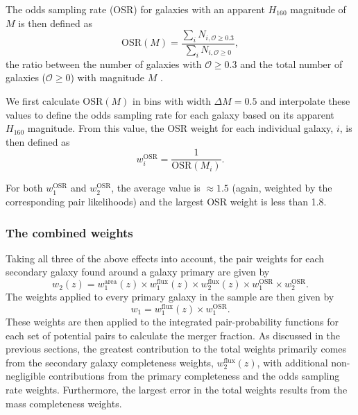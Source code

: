 The odds sampling rate (OSR) for galaxies with an apparent $H_{160}$ magnitude of $M$ is then defined as
\begin{equation}
	\text{OSR}(M) = \frac{\sum_{i} N_{i, \mathcal{O} \geq 0.3}} {\sum_{i} N_{i, \mathcal{O} \geq 0} },
\end{equation}
the ratio between the number of galaxies with $\mathcal{O} \geq 0.3$  and the total number of galaxies ($\mathcal{O} \geq 0$) with magnitude $M$ \citep{Molino:2014iz}.

We first calculate $\text{OSR}(M)$ in bins with width $\Delta M = 0.5$ and interpolate these values to define the odds sampling rate for each galaxy based on its apparent $H_{160}$ magnitude. From this value, the OSR weight for each individual galaxy, $i$, is then defined as
\begin{equation}
	w^{\text{OSR}}_{i} = \frac{1} {\text{OSR}(M_{i})}	.
\end{equation}

For both $w^{\text{OSR}}_{1}$ and $w^{\text{OSR}}_{2}$, the average value is $\approx 1.5$ (again, weighted by the corresponding pair likelihoods) and the largest OSR weight is less than 1.8.

\subsubsection{The combined weights}
Taking all three of the above effects into account, the pair weights for each secondary galaxy found around a galaxy primary are given by
\begin{equation}\label{eq:flux_weights_2}
w_{\text{2}}(z) = w^{\text{area}}_{1}(z) \times 
							w^{\text{flux}}_{1}(z) \times w^{\text{flux}}_{2}(z) \times w^{\text{OSR}}_{1}
							\times w^{\text{OSR}}_{2}.
\end{equation}
The weights applied to every primary galaxy in the sample are then given by
\begin{equation}\label{eq:flux_weights_1}
w_{\text{1}} =  w^{\text{flux}}_{1}(z)  \times w^{\text{OSR}}_{1}.
\end{equation}
These weights are then applied to the integrated pair-probability functions for each set of potential pairs to calculate the merger fraction.
As discussed in the previous sections, the greatest contribution to the total weights primarily comes from the secondary galaxy completeness weights, $w^{\text{flux}}_{2}(z)$, with additional non-negligible contributions from the primary completeness and the odds sampling rate weights. Furthermore, the largest error in the total weights results from the mass completeness weights. 

